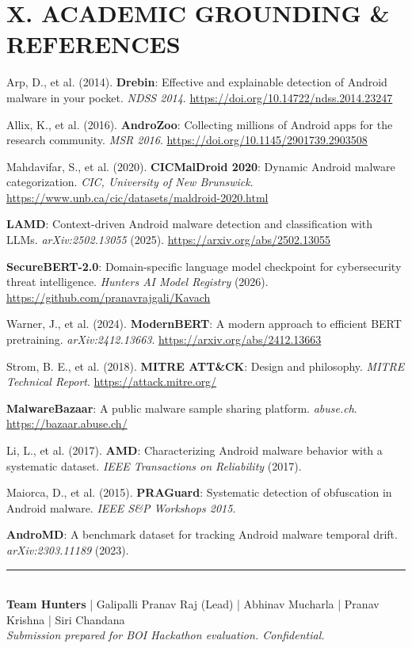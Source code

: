 \documentclass[10pt,a4paper]{article}
\begin{document}
\section{X. ACADEMIC GROUNDING \& REFERENCES}

\begin{enumerate}[label={[\arabic*]}]
  \item Arp, D., et al. (2014). \textbf{Drebin}: Effective and explainable detection of Android malware in your pocket. \textit{NDSS 2014}. \url{https://doi.org/10.14722/ndss.2014.23247}
  \item Allix, K., et al. (2016). \textbf{AndroZoo}: Collecting millions of Android apps for the research community. \textit{MSR 2016}. \url{https://doi.org/10.1145/2901739.2903508}
  \item Mahdavifar, S., et al. (2020). \textbf{CICMalDroid 2020}: Dynamic Android malware categorization. \textit{CIC, University of New Brunswick}. \url{https://www.unb.ca/cic/datasets/maldroid-2020.html}
  \item \textbf{LAMD}: Context-driven Android malware detection and classification with LLMs. \textit{arXiv:2502.13055} (2025). \url{https://arxiv.org/abs/2502.13055}
  \item \textbf{SecureBERT-2.0}: Domain-specific language model checkpoint for cybersecurity threat intelligence. \textit{Hunters AI Model Registry} (2026). \url{https://github.com/pranavrajgali/Kavach}
  \item Warner, J., et al. (2024). \textbf{ModernBERT}: A modern approach to efficient BERT pretraining. \textit{arXiv:2412.13663}. \url{https://arxiv.org/abs/2412.13663}
  \item Strom, B. E., et al. (2018). \textbf{MITRE ATT\&CK}: Design and philosophy. \textit{MITRE Technical Report}. \url{https://attack.mitre.org/}
  \item \textbf{MalwareBazaar}: A public malware sample sharing platform. \textit{abuse.ch}. \url{https://bazaar.abuse.ch/}
  \item Li, L., et al. (2017). \textbf{AMD}: Characterizing Android malware behavior with a systematic dataset. \textit{IEEE Transactions on Reliability} (2017).
  \item Maiorca, D., et al. (2015). \textbf{PRAGuard}: Systematic detection of obfuscation in Android malware. \textit{IEEE S\&P Workshops 2015}.
  \item \textbf{AndroMD}: A benchmark dataset for tracking Android malware temporal drift. \textit{arXiv:2303.11189} (2023).
\end{enumerate}

\vspace{12pt}
\begin{center}
\rule{0.6\linewidth}{0.8pt}\\[4pt]
{\small\textbf{Team Hunters} | Galipalli Pranav Raj (Lead) | Abhinav Mucharla | Pranav Krishna | Siri Chandana}\\
{\small\textit{Submission prepared for BOI Hackathon evaluation. Confidential.}}
\end{center}
\end{document}

